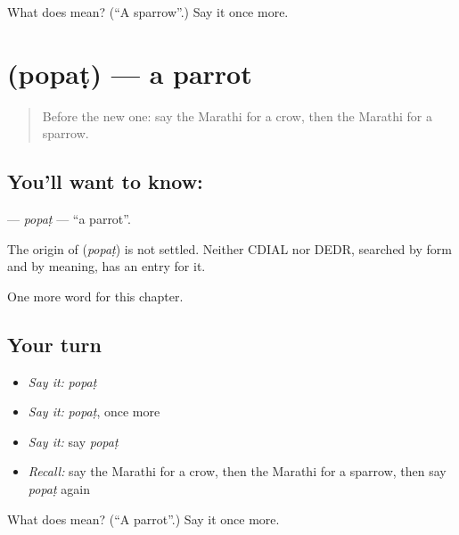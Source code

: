 \begin{tcolorbox}[breakable,colback=teal!4,colframe=teal!35!black,title={Before you move on}]
What does  mean? (\textquotedblleft{}A sparrow\textquotedblright{}.) Say it once more.
\end{tcolorbox}
\section[\texorpdfstring{\mr{पोपट} (popaṭ)}{पोपट (popaṭ)}]{ (popaṭ) — a parrot}

\label{lesson:MR-C142-popat}



\begin{quote}
Before the new one: say the Marathi for a crow, then the Marathi for a sparrow.
\end{quote}

\subsection*{You'll want to know: }
\textbf{} — \emph{popaṭ} — \textquotedblleft{}a parrot\textquotedblright{}.

\begin{cousinweb}
The origin of \textbf{} (\emph{popaṭ}) is not settled. Neither CDIAL nor DEDR, searched by form and by meaning, has an entry for it.
\end{cousinweb}

\begin{grammarlens}[title={What you've built}]
One more word for this chapter.
\end{grammarlens}

\subsection*{Your turn}
\begin{itemize}
\raggedright
  \item \emph{Say it:} \emph{popaṭ}
  \item \emph{Say it:} \emph{popaṭ}, once more
  \item \emph{Say it:} say \emph{popaṭ}
  \item \emph{Recall:} say the Marathi for a crow, then the Marathi for a sparrow, then say \emph{popaṭ} again
\end{itemize}

\begin{tcolorbox}[breakable,colback=teal!4,colframe=teal!35!black,title={Before you move on}]
What does  mean? (\textquotedblleft{}A parrot\textquotedblright{}.) Say it once more.
\end{tcolorbox}
